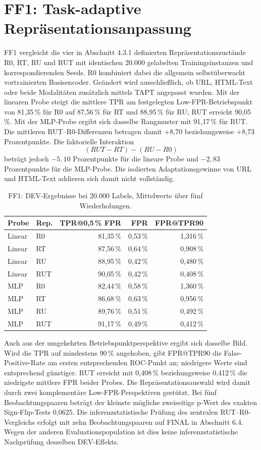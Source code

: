 \section{FF1: Task-adaptive Repräsentationsanpassung}

FF1 vergleicht die vier in Abschnitt 4.3.1 definierten Repräsentationszustände R0, RT, RU
und RUT mit identischen 20.000 gelabelten Trainingsinstanzen und korrespondierenden Seeds.
R0 kombiniert dabei die allgemein selbstüberwacht vortrainierten Basisencoder. Geändert wird
ausschließlich, ob URL, HTML-Text oder beide Modalitäten zusätzlich mittels TAPT angepasst
wurden. Mit der linearen Probe steigt die mittlere TPR am festgelegten Low-FPR-Betriebspunkt von
81,35\,\% für R0 auf 87,56\,\% für RT und 88,95\,\% für RU; RUT erreicht 90,05\,\%.
Mit der MLP-Probe ergibt sich dasselbe Rangmuster mit 91,17\,\% für RUT. Die mittleren
RUT--R0-Differenzen betragen damit +8,70 beziehungsweise +8,73 Prozentpunkte. Die
faktorielle Interaktion
\[
(RUT-RT)-(RU-R0)
\]
beträgt jedoch $-5{,}10$ Prozentpunkte für die lineare Probe und $-2{,}83$ Prozentpunkte
für die MLP-Probe. Die isolierten Adaptationsgewinne von URL und HTML-Text addieren sich
damit nicht vollständig.

\begin{table}[htbp]
\centering
\caption{FF1: DEV-Ergebnisse bei 20.000 Labels, Mittelwerte über fünf Wiederholungen.}
\label{tab:ff1_dev}
\small
\begin{tabular}{llrrr}
\toprule
Probe & Rep. & TPR@0,5\,\% FPR & FPR & FPR@TPR90 \\
\midrule
Linear & R0  & 81,35\,\% & 0,53\,\% & 1,316\,\% \\
Linear & RT  & 87,56\,\% & 0,64\,\% & 0,908\,\% \\
Linear & RU  & 88,95\,\% & 0,42\,\% & 0,480\,\% \\
Linear & RUT & 90,05\,\% & 0,42\,\% & 0,408\,\% \\
\addlinespace
MLP & R0  & 82,44\,\% & 0,58\,\% & 1,360\,\% \\
MLP & RT  & 86,68\,\% & 0,63\,\% & 0,956\,\% \\
MLP & RU  & 89,76\,\% & 0,51\,\% & 0,492\,\% \\
MLP & RUT & 91,17\,\% & 0,49\,\% & 0,412\,\% \\
\bottomrule
\end{tabular}
\end{table}

Auch aus der umgekehrten Betriebspunktperspektive ergibt sich dasselbe Bild. Wird die TPR
auf mindestens 90\,\% angehoben, gibt FPR@TPR90 die False-Positive-Rate am
ersten entsprechenden ROC-Punkt an; niedrigere
Werte sind entsprechend günstiger. RUT erreicht mit 0,408\,\% beziehungsweise 0,412\,\%
die niedrigste mittlere FPR beider Probes. Die Repräsentationsauswahl wird damit durch zwei
komplementäre Low-FPR-Perspektiven gestützt. Bei fünf Beobachtungspaaren beträgt der
kleinste mögliche zweiseitige p-Wert des exakten Sign-Flip-Tests 0,0625. Die inferenzstatistische
Prüfung des zentralen RUT--R0-Vergleichs erfolgt mit zehn Beobachtungspaaren
auf FINAL in Abschnitt 6.4. Wegen der anderen Evaluationspopulation ist dies keine
inferenzstatistische Nachprüfung desselben DEV-Effekts.

